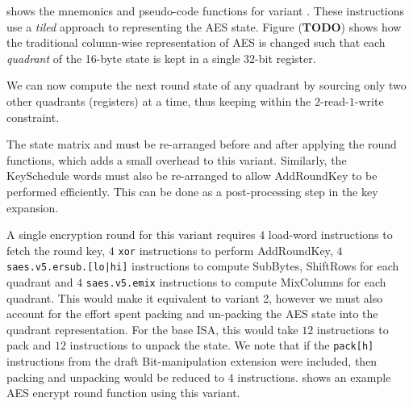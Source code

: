 
 shows the mnemonics and pseudo-code functions
for variant .
These instructions use a {\em tiled} approach to representing the
AES state.
Figure ({\bf TODO}) shows how the traditional column-wise representation
of AES is changed such that each {\em quadrant} of the 16-byte state
is kept in a single $32$-bit register.

We can now compute the next round state of any quadrant by sourcing
only two other quadrants (registers) at a time, thus keeping within
the $2$-read-$1$-write constraint.

The state matrix and must be re-arranged before and after applying
the round functions, which adds a small overhead to this variant.
Similarly, the KeySchedule words must also be re-arranged to allow
AddRoundKey to be performed efficiently.
This can be done as a post-processing step in the key expansion.

A single encryption round for this variant requires
$4$ load-word instructions to fetch the round key,
$4$ {\tt xor} instructions to perform AddRoundKey,
$4$ {\tt saes.v5.ersub.[lo|hi]} instructions to compute
    SubBytes, ShiftRows for each quadrant
and
$4$ {\tt saes.v5.emix} instructions to compute MixColumns for each
quadrant.
This would make it equivalent to variant 2, however we must also
account for the effort spent packing and un-packing the AES
state into the quadrant representation.
For the base ISA, this would take $12$ instructions to pack and
$12$ instructions to unpack the state.
We note that if the {\tt pack[h]} instructions from the draft
Bit-manipulation extension were included, then packing and unpacking
would be reduced to $4$ instructions.
 shows an example AES encrypt round function
using this variant.


